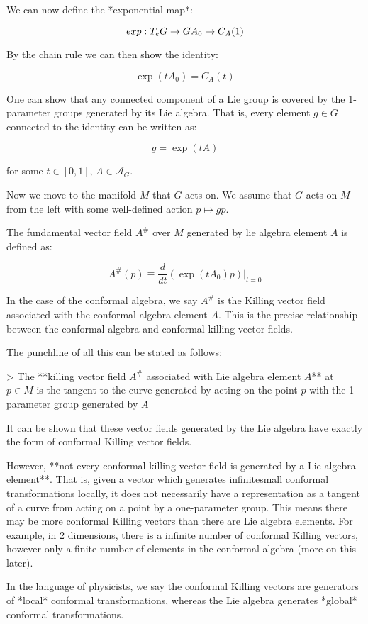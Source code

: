 We can now define the *exponential map*:

$$exp:  T_eG \to G \\ A_0 \mapsto C_A(1)$$

By the chain rule we can then show the identity:

$$\exp(tA_0) = C_A(t)$$


 One can show that any connected component of a Lie group is covered by the 1-parameter groups generated by its Lie algebra.  That is, every element $g \in G$ connected to the identity can be written as:

$$g = \exp(tA)$$

for some $t \in [0, 1]$, $A \in \mathcal{A}_G$.

Now we move to the manifold $M$ that $G$ acts on. We assume that  $G$ acts on $M$ from the left with some well-defined action $p \mapsto gp$.

The fundamental vector field $A^\#$ over $M$ generated by lie algebra element $A$ is defined as:

$$ A^\#(p) \equiv \frac{d}{dt} (\exp(tA_0) p) |_{t =0}$$

In the case of the conformal algebra, we say $A^\#$ is the Killing vector field associated with the conformal algebra element $A$. This is the precise relationship between the conformal algebra and conformal killing vector fields. 

The punchline of all this can be stated as follows:

> The **killing vector field $A^\#$ associated with Lie algebra element $A$** at $p \in M$ is the tangent to the curve generated by acting on the point $p$ with the 1-parameter group generated by $A$

It can be shown that these vector fields generated by the Lie algebra have exactly the form of conformal Killing vector fields. 

However, **not every conformal killing vector field is generated by a Lie algebra element**. That is, given a vector which generates infinitesmall conformal transformations locally, it does not necessarily have a representation as a tangent of a curve from acting on a point by a one-parameter group. This means there may be more conformal Killing vectors than there are Lie algebra elements. For example, in 2 dimensions, there is a infinite number of conformal Killing vectors, however only a finite number of elements in the conformal algebra (more on this later). 

In the language of physicists, we say the conformal Killing vectors are generators of *local* conformal transformations, whereas the Lie algebra generates *global* conformal transformations.

